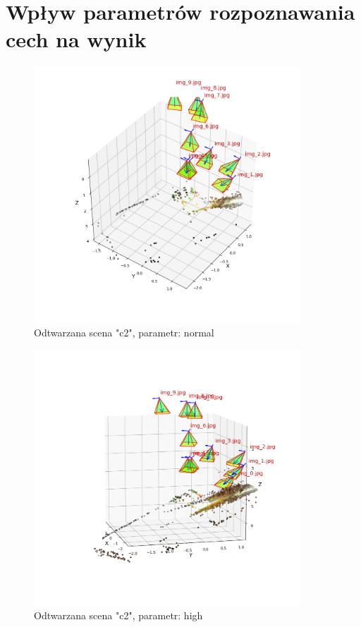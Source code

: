 \section{Wpływ parametrów rozpoznawania cech na wynik}
\begin{figure}[h]
   \centering
   \includegraphics[width=10cm]{preset_c2/normal.png}
   \caption{Odtwarzana scena "c2", parametr: normal}
   \label {fig:preset_c2_normal}
\end{figure}
\begin{figure}[h]
   \centering
   \includegraphics[width=10cm]{preset_c2/high.png}
   \caption{Odtwarzana scena "c2", parametr: high}
   \label {fig:preset_c2_high}
\end{figure}
